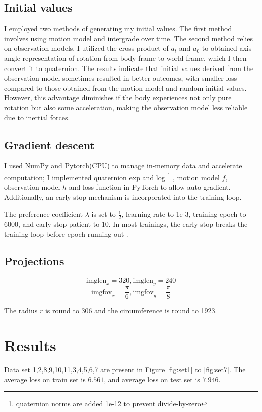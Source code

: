\documentclass[conference]{IEEEtran}
\begin{document}
\subsection{Initial values}
I employed two methods of generating my initial values.
The first method involves using motion model and intergrade over time. 
The second method relies on observation models.
I utilized the cross product of $a_t$ and $a_0$ to obtained 
axis-angle representation of rotation from body frame to world frame, 
which I then convert it to quaternion.
The results indicate that initial values derived from the observation model sometimes 
resulted in better outcomes, 
with smaller loss compared to those obtained from the motion model and random initial values. 
However, this advantage diminishes if the body experiences not only pure rotation 
but also some acceleration, 
making the observation model less reliable due to inertial forces.

\subsection{Gradient descent}
I used NumPy and Pytorch(CPU) to manage in-memory data and accelerate computation;
I implemented quaternion exp and log
\footnote{quaternion norms are added 1e-12 to prevent divide-by-zero}
, motion model $f$, observation model $h$ and loss function in PyTorch to allow auto-gradient.
Additionally, an early-stop mechanism is incorporated into the training loop.

The preference coefficient $\lambda$ is set to $\frac12$,
learning rate to 1e-3,
training epoch to 6000,
and early stop patient to 10.
In most trainings, the early-stop breaks the training loop before epoch running out .

\subsection{Projections}
$$\text{imglen}_{x} = 320, \text{imglen}_{y}=240$$
$$\text{imgfov}_{x} = \frac{\pi}{6}, \text{imgfov}_{y} = \frac{\pi}{8}$$

The radius $r$ is round to 306 and the circumference is round to 1923.

\section{Results}
Data set 1,2,8,9,10,11,3,4,5,6,7 are present in Figure
\ref*{fig:set1} to \ref*{fig:set7}.
The average loss on train set is $6.561$, 
and average loss on test set is $7.946$.
\end{document}
